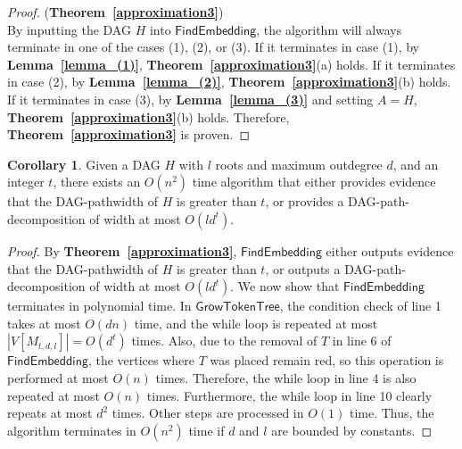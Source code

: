 \documentclass[runningheads]{llncs}
\theoremstyle{plain}
\newtheorem{cor}{Corollary}
\theoremstyle{definition}
\newtheorem{cor}{Corollary}
\begin{document}
\begin{proof}(\textbf{Theorem~\ref{approximation3}})\\
    By inputting the DAG $H$ into $\mathsf{FindEmbedding}$, the algorithm will always terminate in one of the cases (1), (2), or (3). If it terminates in case (1), by \textbf{Lemma~\ref{lemma_(1)}}, \textbf{Theorem~\ref{approximation3}}(a) holds. If it terminates in case (2), by \textbf{Lemma~\ref{lemma_(2)}}, \textbf{Theorem~\ref{approximation3}}(b) holds. If it terminates in case (3), by \textbf{Lemma~\ref{lemma_(3)}} and setting $A = H$, \textbf{Theorem~\ref{approximation3}}(b) holds. Therefore, \textbf{Theorem~\ref{approximation3}} is proven.
\end{proof}

\begin{cor}
    Given a DAG $H$ with $l$ roots and maximum outdegree $d$, and an integer $t$, there exists an $O(n^2)$ time algorithm that either provides evidence that the DAG-pathwidth of $H$ is greater than $t$, or provides a DAG-path-decomposition of width at most $O(ld^t)$.
\end{cor}

\begin{proof}
    By \textbf{Theorem~\ref{approximation3}}, $\mathsf{FindEmbedding}$ either outputs evidence that the DAG-pathwidth of $H$ is greater than $t$, or outputs a DAG-path-decomposition of width at most $O(ld^t)$. We now show that $\mathsf{FindEmbedding}$ terminates in polynomial time. In $\mathsf{GrowTokenTree}$, the condition check of line 1 takes at most $O(dn)$ time, and the while loop is repeated at most $|V[M_{t, d, l}]| = O(d^t)$ times. Also, due to the removal of $T$ in line 6 of $\mathsf{FindEmbedding}$, the vertices where $T$ was placed remain red, so this operation is performed at most $O(n)$ times. Therefore, the while loop in line 4 is also repeated at most $O(n)$ times. Furthermore, the while loop in line 10 clearly repeats at most $d^2$ times. Other steps are processed in $O(1)$ time. Thus, the algorithm terminates in $O(n^2)$ time if $d$ and $l$ are bounded by constants.
\end{proof}
\end{document}
